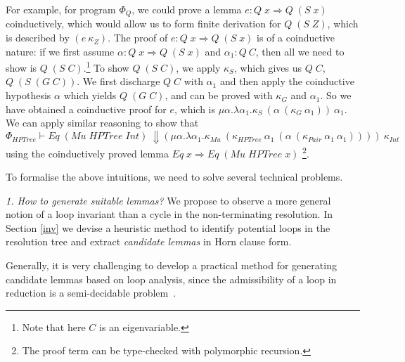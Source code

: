 \documentclass{llncs}
\newcommand{\Conid}[1]{\mathit{#1}}
\newcommand{\Varid}[1]{\mathit{#1}}
\begin{document}
For example, for program $\Phi_Q$, we could prove a lemma
\ensuremath{\Varid{e}\mathbin{:}\Conid{Q}\;\Varid{x}\Rightarrow \Conid{Q}\;(\Conid{S}\;\Varid{x})} coinductively, 
which would allow us to form finite derivation for \ensuremath{\Conid{Q}\;(\Conid{S}\;\Conid{Z})}, which is described by $(e \ \kappa_Z)$.
The proof of \ensuremath{\Varid{e}\mathbin{:}\Conid{Q}\;\Varid{x}\Rightarrow \Conid{Q}\;(\Conid{S}\;\Varid{x})} is of a coinductive nature: if we first assume
 $\alpha : \ensuremath{\Conid{Q}\;\Varid{x}\Rightarrow \Conid{Q}\;(\Conid{S}\;\Varid{x})}$ and $\alpha_1 : Q \ C$, then all we need to show
is \ensuremath{\Conid{Q}\;(\Conid{S}\;\Conid{C})}.\footnote{Note that here \ensuremath{\Conid{C}} is an eigenvariable.}
To show \ensuremath{\Conid{Q}\;(\Conid{S}\;\Conid{C})}, we apply $\kappa_S$, which gives us \ensuremath{\Conid{Q}\;\Conid{C}}, \ensuremath{\Conid{Q}\;(\Conid{S}\;(\Conid{G}\;\Conid{C}))}. We first discharge \ensuremath{\Conid{Q}\;\Conid{C}}
 with $\alpha_1$ and then  apply the coinductive hypothesis $\alpha$ which 
 yields \ensuremath{\Conid{Q}\;(\Conid{G}\;\Conid{C})}, and can be proved with $\kappa_G$ and $\alpha_1$. So we
have obtained a coinductive proof for $e$, which is $\mu \alpha .\lambda
\alpha_1 . \kappa_S\ (\alpha\ (\kappa_G\ \alpha_1))\ \alpha_1$. We can apply
similar reasoning to show that $\Phi_{\ensuremath{\Conid{HPTree}}} \vdash \ensuremath{\Conid{Eq}\;(\Conid{Mu}\;\Conid{HPTree}\;\Conid{Int})} \  \Downarrow (\mu \alpha . \lambda \alpha_1 . \kappa_{\ensuremath{\Conid{Mu}}}\ (\kappa_{\ensuremath{\Conid{HPTree}}}\ \alpha_1\ (\alpha\  (\kappa_{\ensuremath{\Conid{Pair}}}\ \alpha_1\ \alpha_1)))) \ \kappa_{\ensuremath{\Conid{Int}}}$
using the coinductively proved lemma \ensuremath{\Conid{Eq}\;\Varid{x}\Rightarrow \Conid{Eq}\;(\Conid{Mu}\;\Conid{HPTree}\;\Varid{x})} \footnote{The proof term can be type-checked with polymorphic recursion.}.

To formalise the above intuitions, we need to solve several technical problems.




  \textit{1. How to generate suitable lemmas?} We propose to observe a more general notion of a loop invariant than a cycle in the non-terminating resolution. In Section \ref{inv} we devise a heuristic method to identify potential loops in the resolution tree and extract \textit{candidate lemmas} in Horn clause form. 

\noindent Generally, it is very challenging to develop a practical method for generating
candidate lemmas based on loop analysis, since the admissibility of a loop in reduction is a semi-decidable problem~\cite{zantema1996non}. 
\end{document}
